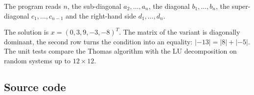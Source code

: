 The program reads $n$, the sub-diagonal $a_2, \ldots, a_n$, the diagonal $b_1, \ldots, b_n$,
the super-diagonal $c_1, \ldots, c_{n-1}$ and the right-hand side $d_1, \ldots, d_n$.




The solution is $x = (0, 3, 9, -3, -8)^T$. The matrix of the variant is diagonally dominant, the
second row turns the condition into an equality: $|-13| = |8| + |-5|$. The unit tests compare the
Thomas algorithm with the LU decomposition on random systems up to $12 \times 12$.

\subsection{Source code}




\pagebreak
